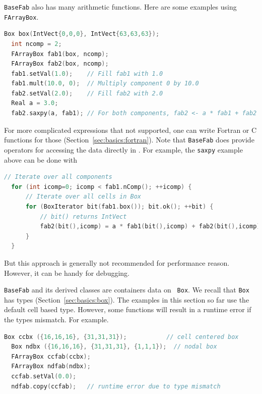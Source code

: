 {{\tt BaseFab} also has many arithmetic functions.  Here are some
examples using {\tt FArrayBox}.
\begin{lstlisting}[language=cpp]
  Box box(IntVect{0,0,0}, IntVect{63,63,63});
  int ncomp = 2;
  FArrayBox fab1(box, ncomp);
  FArrayBox fab2(box, ncomp);
  fab1.setVal(1.0);    // Fill fab1 with 1.0
  fab1.mult(10.0, 0);  // Multiply component 0 by 10.0
  fab2.setVal(2.0);    // Fill fab2 with 2.0
  Real a = 3.0;
  fab2.saxpy(a, fab1); // For both components, fab2 <- a * fab1 + fab2
\end{lstlisting}
For more complicated expressions that not supported, one can write
Fortran or C functions for those (Section~\ref{sec:basics:fortran}).
Note that {\tt BaseFab} does provide operators for accessing the
data directly in \cpp.  For example, the {\tt saxpy} example above can
be done with
\begin{lstlisting}[language=cpp]
  // Iterate over all components
  for (int icomp=0; icomp < fab1.nComp(); ++icomp) {
      // Iterate over all cells in Box
      for (BoxIterator bit(fab1.box()); bit.ok(); ++bit) {
          // bit() returns IntVect
          fab2(bit(),icomp) = a * fab1(bit(),icomp) + fab2(bit(),icomp);
      }
  }
\end{lstlisting}
But this approach is generally not recommended for performance reason.
However, it can be handy for debugging.

{\tt BaseFab} and its derived classes are containers data on {\tt
  Box}.  We recall that {\tt Box} has types
(Section~\ref{sec:basics:box}).  The examples in this section so far
use the default cell based type.  However, some functions will result
in a runtime error if the types mismatch.  For example.
\begin{lstlisting}[language=cpp]
  Box ccbx ({16,16,16}, {31,31,31});           // cell centered box
  Box ndbx ({16,16,16}, {31,31,31}, {1,1,1});  // nodal box
  FArrayBox ccfab(ccbx);
  FArrayBox ndfab(ndbx);
  ccfab.setVal(0.0);
  ndfab.copy(ccfab);   // runtime error due to type mismatch
\end{lstlisting}

}
